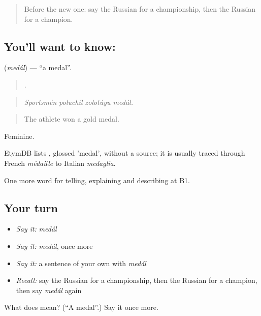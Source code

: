 \begin{quote}
Before the new one: say the Russian for a championship, then the Russian for a champion.
\end{quote}

\subsection*{You'll want to know: }
\textbf{} (\emph{medál}) — \textquotedblleft{}a medal\textquotedblright{}.

\begin{quote}
   .
\end{quote}

\begin{quote}
\emph{Sportsmén poluchíl zolotúyu medál.}
\end{quote}

\begin{quote}
The athlete won a gold medal.
\end{quote}

Feminine.

\begin{cousinweb}
EtymDB lists \emph{}, glossed 'medal', without a source; it is usually traced through French \emph{médaille} to Italian \emph{medaglia}.
\end{cousinweb}

\begin{grammarlens}[title={What you've built}]
One more word for telling, explaining and describing at B1.
\end{grammarlens}

\subsection*{Your turn}
\begin{itemize}
\raggedright
  \item \emph{Say it:} \emph{medál}
  \item \emph{Say it:} \emph{medál}, once more
  \item \emph{Say it:} a sentence of your own with \emph{medál}
  \item \emph{Recall:} say the Russian for a championship, then the Russian for a champion, then say \emph{medál} again
\end{itemize}

\begin{tcolorbox}[breakable,colback=teal!4,colframe=teal!35!black,title={Before you move on}]
What does  mean? (\textquotedblleft{}A medal\textquotedblright{}.) Say it once more.
\end{tcolorbox}
